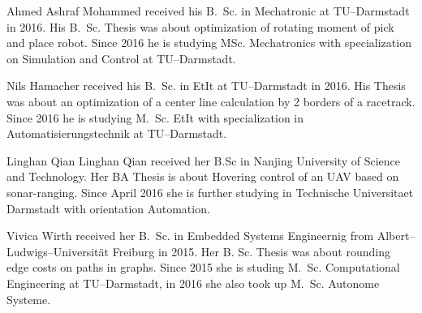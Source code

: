 \documentclass[journal,final,a4paper,twoside]{PS}
\begin{document}
\begin{biography}
{Ahmed Ashraf Mohammed} received his B.~Sc. in Mechatronic at TU--Darmstadt in 2016.
His B.~Sc. Thesis was about optimization of rotating moment of pick and place robot. Since 2016 he is studying MSc. Mechatronics with specialization on Simulation and Control at TU--Darmstadt.
\end{biography}
\begin{biography}
{Nils Hamacher} received his B.~Sc. in EtIt at TU--Darmstadt in 2016. His Thesis was about an optimization of a center line calculation by 2 borders of a racetrack. Since 2016 he is studying M.~Sc. EtIt with specialization in Automatisierungstechnik at TU--Darmstadt.
\end{biography}
\begin{biography}
{Linghan Qian}
Linghan Qian received her B.Sc in Nanjing University of Science and Technology. Her BA Thesis is about Hovering control of an UAV based on sonar-ranging. Since April 2016 she is further studying in Technische Universitaet Darmstadt with orientation Automation.
\end{biography}
\begin{biography}
{Vivica Wirth}
received her B.~Sc. in Embedded Systems Engineernig from Albert--Ludwigs--Universität Freiburg in 2015. Her B. Sc. Thesis was about rounding edge costs on paths in graphs. Since 2015 she is studing M.~Sc. Computational Engineering at TU--Darmstadt, in 2016 she also took up M.~Sc. Autonome Systeme.

\end{biography}
\end{document}
